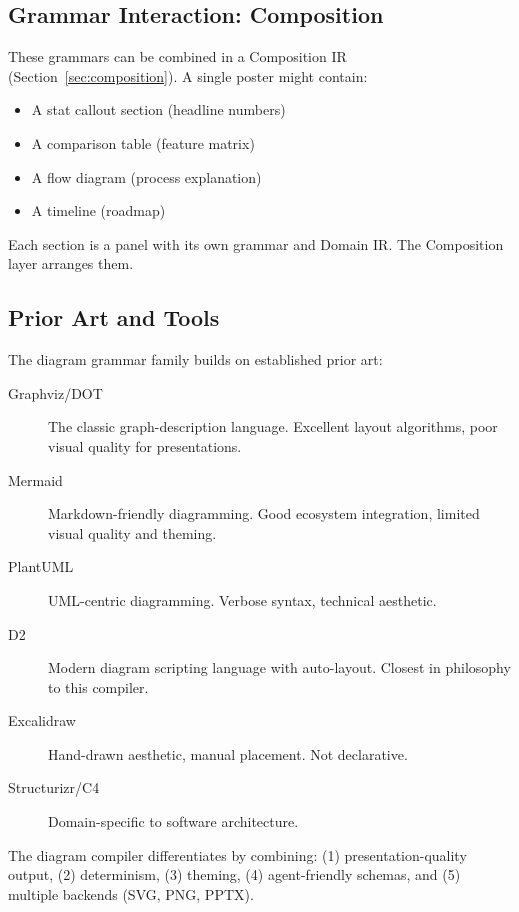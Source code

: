 \subsection{Grammar Interaction: Composition}

These grammars can be combined in a Composition IR (Section~\ref{sec:composition}). A single poster might contain:

\begin{itemize}
  \item A stat callout section (headline numbers)
  \item A comparison table (feature matrix)
  \item A flow diagram (process explanation)
  \item A timeline (roadmap)
\end{itemize}

Each section is a panel with its own grammar and Domain IR. The Composition layer arranges them.

\subsection{Prior Art and Tools}
\label{sec:diagram-prior-art}

The diagram grammar family builds on established prior art:

\begin{description}
  \item[Graphviz/DOT~\cite{graphviz}] The classic graph-description language. Excellent layout algorithms, poor visual quality for presentations.
  
  \item[Mermaid~\cite{mermaid2023}] Markdown-friendly diagramming. Good ecosystem integration, limited visual quality and theming.
  
  \item[PlantUML~\cite{plantuml}] UML-centric diagramming. Verbose syntax, technical aesthetic.
  
  \item[D2~\cite{d2lang}] Modern diagram scripting language with auto-layout. Closest in philosophy to this compiler.
  
  \item[Excalidraw] Hand-drawn aesthetic, manual placement. Not declarative.
  
  \item[Structurizr/C4~\cite{structurizr}] Domain-specific to software architecture.
\end{description}

The diagram compiler differentiates by combining: (1) presentation-quality output, (2) determinism, (3) theming, (4) agent-friendly schemas, and (5) multiple backends (SVG, PNG, PPTX).
